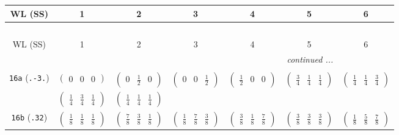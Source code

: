 \documentclass[fleqn,9pt,landscape]{jsarticle}
\begin{document}
\begin{center}
\renewcommand{\arraystretch}{1.2}
\begin{longtable}{ccccccc}
 \hline \hline
WL (SS) & 1 & 2 & 3 & 4 & 5 & 6 \\ \hline \endfirsthead

\multicolumn{6}{l}{\tablename\ \thetable{}} \\
 \hline \hline
WL (SS) & 1 & 2 & 3 & 4 & 5 & 6 \\ \hline \endhead

 \hline \hline
\multicolumn{6}{r}{\footnotesize\it continued ...} \\ \endfoot

 \hline \hline
\multicolumn{6}{r}{} \\ \endlastfoot

{\tt 16a} ({\tt .-3.}) & $ \begin{pmatrix} 0 & 0 & 0 \end{pmatrix} $ & $ \begin{pmatrix} 0 & \frac{1}{2} & 0 \end{pmatrix} $ & $ \begin{pmatrix} 0 & 0 & \frac{1}{2} \end{pmatrix} $ & $ \begin{pmatrix} \frac{1}{2} & 0 & 0 \end{pmatrix} $ & $ \begin{pmatrix} \frac{3}{4} & \frac{1}{4} & \frac{1}{4} \end{pmatrix} $ & $ \begin{pmatrix} \frac{1}{4} & \frac{1}{4} & \frac{3}{4} \end{pmatrix} $ \\
& $ \begin{pmatrix} \frac{1}{4} & \frac{3}{4} & \frac{1}{4} \end{pmatrix} $ & $ \begin{pmatrix} \frac{1}{4} & \frac{1}{4} & \frac{1}{4} \end{pmatrix} $ & $  $ & $  $ & $  $ & $  $ \\ \hline
{\tt 16b} ({\tt .32}) & $ \begin{pmatrix} \frac{1}{8} & \frac{1}{8} & \frac{1}{8} \end{pmatrix} $ & $ \begin{pmatrix} \frac{7}{8} & \frac{3}{8} & \frac{1}{8} \end{pmatrix} $ & $ \begin{pmatrix} \frac{1}{8} & \frac{7}{8} & \frac{3}{8} \end{pmatrix} $ & $ \begin{pmatrix} \frac{3}{8} & \frac{1}{8} & \frac{7}{8} \end{pmatrix} $ & $ \begin{pmatrix} \frac{3}{8} & \frac{3}{8} & \frac{3}{8} \end{pmatrix} $ & $ \begin{pmatrix} \frac{1}{8} & \frac{5}{8} & \frac{7}{8} \end{pmatrix} $ \\

\end{longtable}
\end{center}
\end{document}
